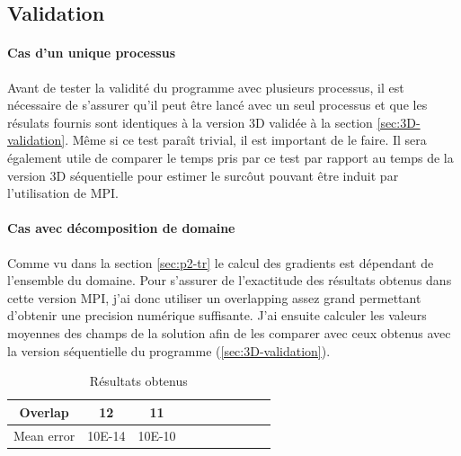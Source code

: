 \subsection{Validation}

\paragraph{Cas d'un unique processus}Avant de tester la validité du programme avec plusieurs processus, il est nécessaire de s'assurer qu'il peut être lancé avec un seul processus et que les résulats fournis sont identiques à la version 3D validée à la section \ref{sec:3D-validation}. Même si ce test paraît trivial, il est important de le faire. Il sera également utile de comparer le temps pris par ce test par rapport au temps de la version 3D séquentielle pour estimer le surcôut pouvant être induit par l'utilisation de MPI.

\paragraph{Cas avec décomposition de domaine}
Comme vu dans la section \ref{sec:p2-tr} le calcul des gradients est dépendant de l'ensemble du domaine. Pour s'assurer de l'exactitude des résultats obtenus dans cette version MPI, j'ai donc utiliser un overlapping assez grand permettant d'obtenir une precision numérique suffisante. J'ai ensuite calculer les valeurs moyennes des champs de la solution afin de les comparer avec ceux obtenus avec la version séquentielle du programme (\ref{sec:3D-validation}).

\begin{table}[h]
  \begin{center}
    \begin{tabular}{|c|c|c||c|c|c|c||c|c|c|}
      \hline
      Overlap & 12 & 11 \\
      \hline
      Mean error & 10E-14 & 10E-10 \\
      \hline
    
    \end{tabular}
    \caption{\label{arr:overlap_res} Résultats obtenus}
  \end{center}
\end{table}
